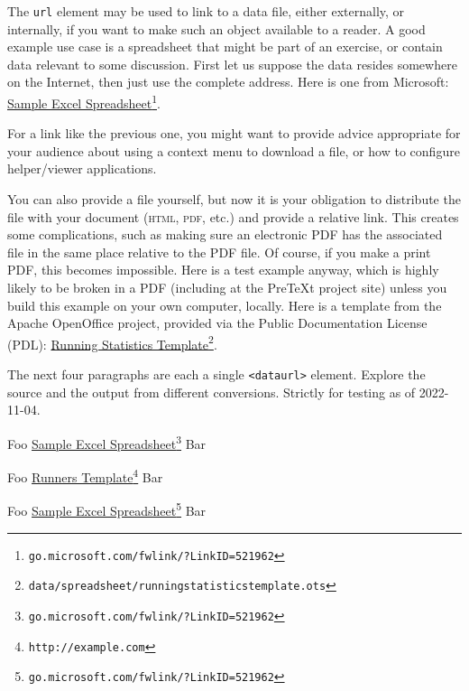 \documentclass[pdflatex]{sn-jnl}
\theoremstyle{thmstyleone}%
\theoremstyle{thmstyletwo}%
\theoremstyle{thmstylethree}%
\newcommand{\mono}[1]{\texttt{#1}}
\newcommand{\initialism}[1]{\textsc{\MakeLowercase{#1}}}
\numberwithin{equation}{section}
\begin{document}
The \mono{url} element may be used to link to a data file, either externally, or internally, if you want to make such an object available to a reader.  A good example use case is a spreadsheet that might be part of an exercise, or contain data relevant to some discussion.  First let us suppose the data resides somewhere on the Internet, then just use the complete address.  Here is one from Microsoft: \href{http://go.microsoft.com/fwlink/?LinkID=521962}{Sample Excel Spreadsheet}\footnote{\nolinkurl{go.microsoft.com/fwlink/?LinkID=521962}\label{section-cross-referencing-16-5}}.%
\par
For a link like the previous one, you might want to provide advice appropriate for your audience about using a context menu to download a file, or how to configure helper\slash{}viewer applications.%
\par
You can also provide a file yourself, but now it is your obligation to distribute the file with your document (\initialism{HTML}, \initialism{PDF}, etc.\@) and provide a relative link.  This creates some complications, such as making sure an electronic PDF has the associated file in the same place relative to the PDF file.  Of course, if you make a print PDF, this becomes impossible.  Here is a test example anyway, which is highly likely to be broken in a PDF (including at the PreTeXt project site) unless you build this example on your own computer, locally.  Here is a template from the Apache OpenOffice project, provided via the Public Documentation License (PDL):  \href{data/spreadsheet/runningstatisticstemplate.ots}{Running Statistics Template}\footnote{\nolinkurl{data/spreadsheet/runningstatisticstemplate.ots}\label{section-cross-referencing-18-6}}.%
\par
The next four paragraphs are each a single \mono{<dataurl>} element.  Explore the source and the output from different conversions.  Strictly for testing as of 2022-11-04.%
\par
Foo \href{http://go.microsoft.com/fwlink/?LinkID=521962}{Sample Excel Spreadsheet}\footnote{\nolinkurl{go.microsoft.com/fwlink/?LinkID=521962}\label{section-cross-referencing-20-2}} Bar%
\par
Foo \href{https://pretextbook.org/examples/sample-article/html/external/data/spreadsheet/runningstatisticstemplate.ots}{Runners Template}\footnote{\nolinkurl{http://example.com}\label{section-cross-referencing-21-2}} Bar%
\par
Foo \href{http://go.microsoft.com/fwlink/?LinkID=521962}{Sample Excel Spreadsheet}\footnote{\nolinkurl{go.microsoft.com/fwlink/?LinkID=521962}\label{section-cross-referencing-22-2}} Bar%
\end{document}
